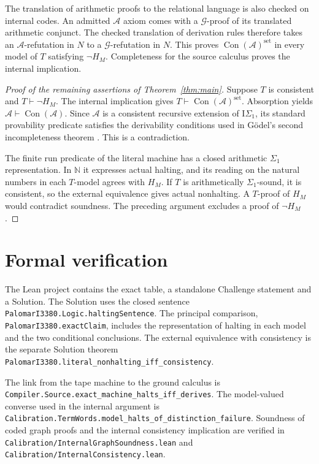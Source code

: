 \documentclass[11pt,letterpaper]{article}
\newcommand{\Con}{\operatorname{Con}}
\newcommand{\code}[1]{\texttt{\nolinkurl{#1}}}
\newcommand{\A}{\mathcal A}
\newcommand{\G}{\mathcal G}
\begin{document}
The translation of arithmetic proofs to the relational language is
also checked on internal codes. An admitted $\A$ axiom comes with a
$\G$-proof of its translated arithmetic conjunct. The checked
translation of derivation rules therefore takes an $\A$-refutation
in $N$ to a $\G$-refutation in $N$. This proves
$\Con(\A)^{\mathrm{set}}$ in every model of $T$ satisfying
$\neg H_M$. Completeness for the source calculus proves the
internal implication.

\begin{proof}[Proof of the remaining assertions of Theorem~\ref{thm:main}]
Suppose $T$ is consistent and $T\vdash\neg H_M$. The internal
implication gives $T\vdash\Con(\A)^{\mathrm{set}}$. Absorption yields
$\A\vdash\Con(\A)$. Since $\A$ is a consistent recursive extension of
$\mathrm I\Sigma_1$, its standard provability predicate satisfies the
derivability conditions used in G\"odel's second incompleteness
theorem \cite{goedel}. This is a contradiction.

The finite run predicate of the literal machine has a closed
arithmetic $\Sigma_1$ representation. In $\mathbb N$ it expresses
actual halting, and its reading on the natural numbers in each
$T$-model agrees with $H_M$. If $T$ is arithmetically
$\Sigma_1$-sound, it is consistent, so the external equivalence gives
actual nonhalting. A $T$-proof of $H_M$ would contradict soundness.
The preceding argument excludes a proof of $\neg H_M$.
\end{proof}

\section{Formal verification}\label{sec:lean}

The Lean project contains the exact table, a standalone Challenge
statement and a Solution. The Solution uses the closed sentence
\code{PalomarI3380.Logic.haltingSentence}. The principal comparison,
\code{PalomarI3380.exactClaim}, includes the representation of halting
in each model and the two conditional conclusions. The external
equivalence with consistency is the separate Solution theorem
\code{PalomarI3380.literal_nonhalting_iff_consistency}.

The link from the tape machine to the ground calculus is
\code{Compiler.Source.exact_machine_halts_iff_derives}.
The model-valued converse used in the internal argument is
\code{Calibration.TermWords.model_halts_of_distinction_failure}.
Soundness of coded graph proofs and the internal consistency
implication are verified in \code{Calibration/InternalGraphSoundness.lean}
and \code{Calibration/InternalConsistency.lean}.
\end{document}

